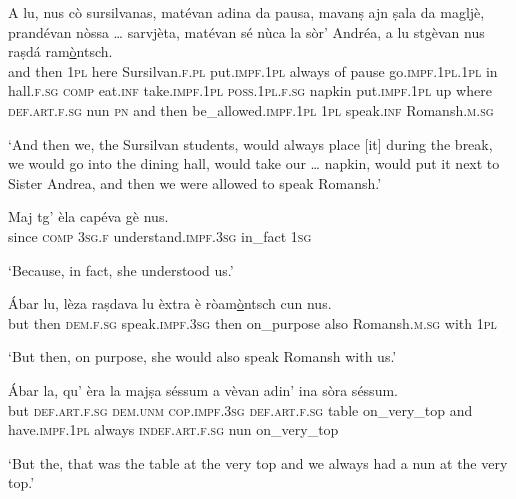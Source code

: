 \begin{linenumbers}
\gll A lu, nus cò sursilvanas, matévan adina da pausa, mavanṣ ajn ṣala da magljè, prandévan nòssa … sarvjèta, matévan sé nùca la sòr’ Andréa, a lu stgèvan nus raṣdá ram\underline{ò}ntsch.\\
and then \textsc{1pl} here Sursilvan.\textsc{f.pl} put.\textsc{impf.1pl} always of pause go.\textsc{impf.1pl.1pl} in hall.\textsc{f.sg} \textsc{comp} eat.\textsc{inf} take.\textsc{impf.1pl} \textsc{poss.1pl.f.sg} {} napkin put.\textsc{impf.1pl} up  where \textsc{def.art.f.sg} nun \textsc{pn} and then be\_allowed.\textsc{impf.1pl} \textsc{1pl} speak.\textsc{inf} Romansh.\textsc{m.sg}\\
\end{linenumbers}
\medskip
\glt `And then we, the Sursilvan students, would always place [it] during the break, we would go into the dining hall, would take our … napkin, would put it next to Sister Andrea, and then we were allowed to speak Romansh.'
\medskip

\begin{linenumbers}
\gll    Maj tg’ èla capéva gè nus.\\
since \textsc{comp} \textsc{3sg.f} understand.\textsc{impf.3sg} in\_fact \textsc{1sg}  \\
\end{linenumbers}
\medskip
\glt `Because, in fact, she understood us.'
\medskip

\begin{linenumbers}
\gll    Ábar lu, lèza raṣdava lu èxtra è ròam\underline{ò}ntsch cun nus.\\
but then \textsc{dem.f.sg} speak.\textsc{impf.3sg} then on\_purpose also Romansh.\textsc{m.sg} with \textsc{1pl}\\
\end{linenumbers}
\medskip
\glt `But then, on purpose, she would also speak Romansh with us.'
\medskip

\begin{linenumbers}
\gll    Ábar la, qu’ èra la majṣa séssum a vèvan adin’ ina sòra séssum.\\
but \textsc{def.art.f.sg} \textsc{dem.unm} \textsc{cop.impf.3sg} \textsc{def.art.f.sg} table on\_very\_top and have.\textsc{impf.1pl} always \textsc{indef.art.f.sg} nun on\_very\_top\\
\end{linenumbers}
\medskip
\glt `But the, that was the table at the very top and we always had a nun at the very top.'
\medskip

